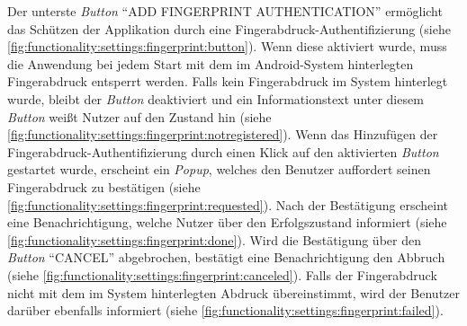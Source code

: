 \documentclass[a4paper]{article}
\begin{document}
Der unterste \textit{Button} "`ADD FINGERPRINT AUTHENTICATION"' ermöglicht das Schützen der Applikation durch eine Fingerabdruck-Authentifizierung (siehe \autoref{fig:functionality:settings:fingerprint:button}).
Wenn diese aktiviert wurde, muss die Anwendung bei jedem Start mit dem im Android-System hinterlegten Fingerabdruck entsperrt werden.
Falls kein Fingerabdruck im System hinterlegt wurde, bleibt der \textit{Button} deaktiviert und ein Informationstext unter diesem \textit{Button} weißt Nutzer auf den Zustand hin (siehe \autoref{fig:functionality:settings:fingerprint:notregistered}).
Wenn das Hinzufügen der Fingerabdruck-Authentifizierung durch einen Klick auf den aktivierten \textit{Button} gestartet wurde, erscheint ein \textit{Popup}, welches den Benutzer auffordert seinen Fingerabdruck zu bestätigen (siehe \autoref{fig:functionality:settings:fingerprint:requested}).
Nach der Bestätigung erscheint eine Benachrichtigung, welche Nutzer über den Erfolgszustand informiert (siehe \autoref{fig:functionality:settings:fingerprint:done}).
Wird die Bestätigung über den \textit{Button} "`CANCEL"' abgebrochen, bestätigt eine Benachrichtigung den Abbruch (siehe \autoref{fig:functionality:settings:fingerprint:canceled}).
Falls der Fingerabdruck nicht mit dem im System hinterlegten Abdruck übereinstimmt, wird der Benutzer darüber ebenfalls informiert (siehe \autoref{fig:functionality:settings:fingerprint:failed}).
\end{document}
